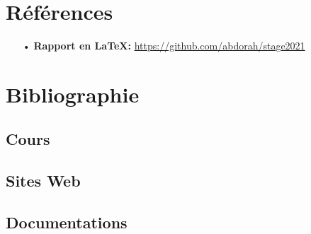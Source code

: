 \documentclass[a4paper]{report}
\begin{document}
\chapter{Références}
\begin{itemize}
	\item[•] \textbf{Rapport en \LaTeX:} \url{https://github.com/abdorah/stage2021}
\end{itemize}
\chapter{Bibliographie}
\section{Cours}
\section{Sites Web}
\section{Documentations}
\end{document}
